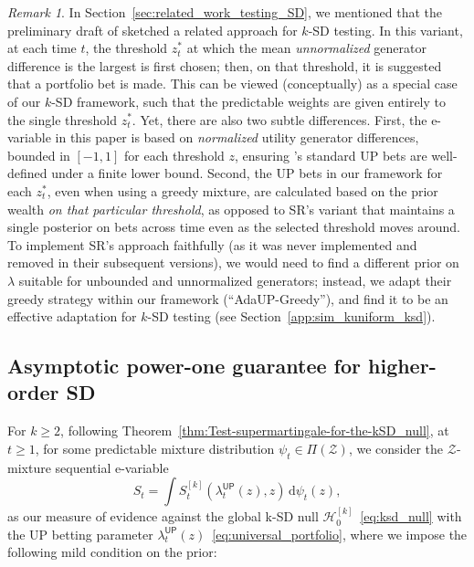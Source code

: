 \documentclass[12pt,twoside]{article}
\theoremstyle{plain}
\theoremstyle{definition}
\theoremstyle{remark}
\newtheorem{remark}{Remark}
\newcommand{\calH}{\mathcal{H}}
\newcommand{\calZ}{\mathcal{Z}}
\newcommand{\fbet}{\lambda}  %
\newcommand{\up}{\mathsf{UP}}
\newcommand{\diff}{\,\mathrm{d}}
\begin{document}
\begin{remark}\label{rem:sr_comparison}
    In Section~\ref{sec:related_work_testing_SD}, we mentioned that the preliminary draft of \citet[SR;][Appendix F.1 of arxiv.v1]{shekhar2023nonparametric} sketched a related approach for $k$-SD testing. 
    In this variant, at each time $t$, the threshold $z_t^*$ at which the mean \emph{unnormalized} generator difference is the largest is first chosen; then, on that threshold, it is suggested that a portfolio bet is made. 
    This can be viewed (conceptually) as a special case of our $k$-SD framework, such that the predictable weights are given entirely to the single threshold $z_t^*$. 
    Yet, there are also two subtle differences. 
    First, the e-variable in this paper is based on \emph{normalized} utility generator differences, bounded in $[-1,1]$ for each threshold $z$, ensuring \citet{cover1991universal}'s standard UP bets are well-defined under a finite lower bound. 
    Second, the UP bets in our framework for each $z_t^*$, even when using a greedy mixture, are calculated based on the prior wealth \emph{on that particular threshold}, as opposed to SR's variant that maintains a single posterior on bets across time even as the selected threshold moves around. 
    To implement SR's approach faithfully (as it was never implemented and removed in their subsequent versions), we would need to find a different prior on $\lambda$ suitable for unbounded and unnormalized generators; instead, we adapt their greedy strategy within our framework (``AdaUP-Greedy''), and find it to be an effective adaptation for $k$-SD testing (see Section~\ref{app:sim_kuniform_ksd}). 
\end{remark}


\subsection{Asymptotic power-one guarantee for higher-order SD}\label{app:power-one_for_higher_order}
For $k\geq 2$, following Theorem~\ref{thm:Test-supermartingale-for-the-kSD_null}, at $t\geq 1$, for some predictable mixture distribution $\psi_t \in \Pi(\calZ)$, we consider the $\calZ$-mixture sequential e-variable
\begin{equation}\label{eq:mixture_e-variable_higher_order}
    S_t = \int S_t^{[k]}(  \fbet_t^\up(z),z)\diff\psi_t( z), 
\end{equation}
as our measure of evidence against the global k-SD null $\calH_0^{[k]}$~\eqref{eq:ksd_null} with the UP betting parameter $\fbet_t^\up(z)$~\eqref{eq:universal_portfolio}, where we impose the following mild condition on the prior:
\end{document}

